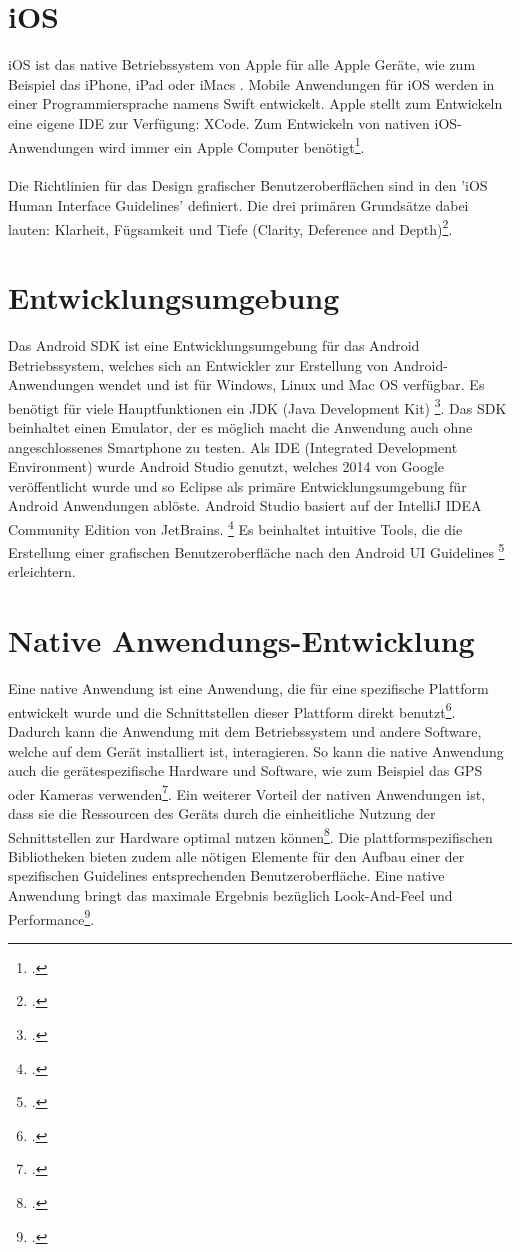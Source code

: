 \section{iOS}

iOS ist das native Betriebssystem von Apple für alle Apple Geräte, wie zum Beispiel das iPhone, iPad oder iMacs . Mobile Anwendungen für iOS werden in einer Programmiersprache  namens Swift entwickelt. Apple stellt zum Entwickeln eine eigene IDE zur Verfügung: XCode. Zum Entwickeln von nativen iOS-Anwendungen wird immer ein Apple Computer benötigt\footcite{iOS}. 
\\
\\
Die Richtlinien für das Design grafischer Benutzeroberflächen sind in den 'iOS Human Interface Guidelines' definiert. Die drei primären Grundsätze dabei lauten: Klarheit, Fügsamkeit und Tiefe (Clarity, Deference and Depth)\footcite{iOSGUI}. 

\section{Entwicklungsumgebung}

Das Android SDK ist eine Entwicklungsumgebung für das Android Betriebssystem, welches sich an Entwickler zur Erstellung von Android-Anwendungen wendet und ist für Windows, Linux und Mac OS verfügbar. Es benötigt für viele Hauptfunktionen ein JDK (Java Development Kit) \footcite{AndroidSDK}. Das SDK beinhaltet einen Emulator, der es möglich macht die Anwendung auch ohne angeschlossenes Smartphone zu testen. Als IDE (Integrated Development Environment) wurde Android Studio genutzt, welches 2014 von Google veröffentlicht wurde und so Eclipse als primäre Entwicklungsumgebung für Android Anwendungen ablöste. Android Studio basiert auf der IntelliJ IDEA Community Edition von JetBrains. \footcite{AndroidOP} Es beinhaltet intuitive Tools, die die Erstellung einer grafischen Benutzeroberfläche nach den Android UI Guidelines \footcite{AndroidGuidelines} erleichtern. 

\section{Native Anwendungs-Entwicklung}

Eine native Anwendung ist eine Anwendung, die für eine spezifische Plattform entwickelt wurde und die Schnittstellen dieser Plattform direkt benutzt\footcite{Varianten}. Dadurch kann die Anwendung mit dem Betriebssystem und andere Software, welche auf dem Gerät installiert ist, interagieren. So kann die native Anwendung auch die gerätespezifische Hardware und Software, wie zum Beispiel das GPS oder Kameras verwenden\footcite{nativeApp1}. Ein weiterer Vorteil der nativen Anwendungen ist, dass sie die Ressourcen des Geräts durch die einheitliche Nutzung der Schnittstellen zur Hardware optimal nutzen können\footcite{nativeApp1}. Die plattformspezifischen Bibliotheken bieten zudem alle nötigen Elemente für den Aufbau einer der spezifischen Guidelines entsprechenden Benutzeroberfläche. Eine native Anwendung bringt das maximale  Ergebnis bezüglich Look-And-Feel und Performance\footcite{Varianten}.

